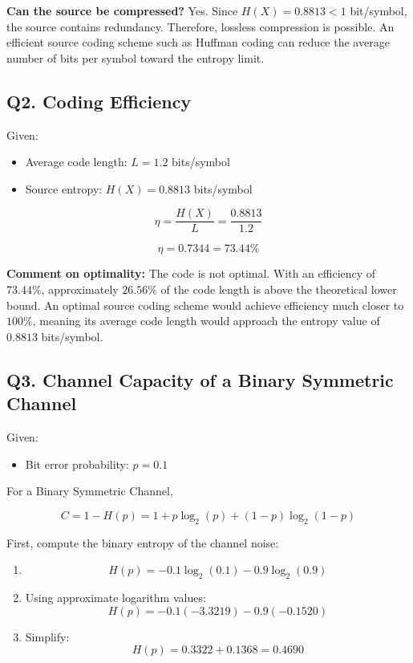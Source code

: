 \documentclass[12pt,a4paper]{article}
\begin{document}
\begin{greenNote}
\textbf{Can the source be compressed?} Yes. Since $H(X)=0.8813 < 1$ bit/symbol, the source contains redundancy. Therefore, lossless compression is possible. An efficient source coding scheme such as Huffman coding can reduce the average number of bits per symbol toward the entropy limit.
\end{greenNote}

\subsection*{Q2. Coding Efficiency}
Given:
\begin{itemize}[leftmargin=2em]
    \item Average code length: $L = 1.2$ bits/symbol
    \item Source entropy: $H(X) = 0.8813$ bits/symbol
\end{itemize}

\begin{formulaBox}
\[
\eta = \frac{H(X)}{L} = \frac{0.8813}{1.2}
\]
\end{formulaBox}

\[
\boxed{\eta = 0.7344 = 73.44\%}
\]

\begin{yellowNote}
\textbf{Comment on optimality:} The code is not optimal. With an efficiency of $73.44\%$, approximately $26.56\%$ of the code length is above the theoretical lower bound. An optimal source coding scheme would achieve efficiency much closer to $100\%$, meaning its average code length would approach the entropy value of $0.8813$ bits/symbol.
\end{yellowNote}

\subsection*{Q3. Channel Capacity of a Binary Symmetric Channel}
Given:
\begin{itemize}[leftmargin=2em]
    \item Bit error probability: $p=0.1$
\end{itemize}

For a Binary Symmetric Channel,
\begin{formulaBox}
\[
C = 1 - H(p) = 1 + p\log_2(p) + (1-p)\log_2(1-p)
\]
\end{formulaBox}

First, compute the binary entropy of the channel noise:
\begin{enumerate}[leftmargin=2em,label=\arabic*.]
    \item
    \[
    H(p) = -0.1\log_2(0.1) - 0.9\log_2(0.9)
    \]

    \item Using approximate logarithm values:
    \[
    H(p) = -0.1(-3.3219) - 0.9(-0.1520)
    \]

    \item Simplify:
    \[
    H(p) = 0.3322 + 0.1368 = 0.4690
    \]
\end{enumerate}
\end{document}
